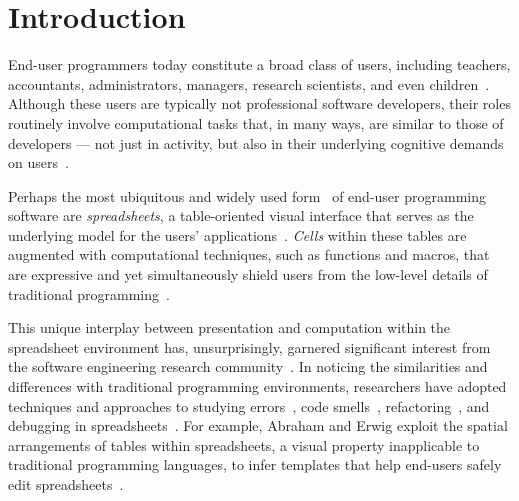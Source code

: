 \documentclass[conference]{IEEEtran}
\begin{document}

\section{Introduction}

End-user programmers today constitute a broad class of users, including teachers, accountants, administrators, managers, research scientists, and even children~\cite{Ko2011}.
%
Although these users are typically not professional software developers, their roles routinely involve computational tasks that, in many ways, are similar to those of developers --- not just in activity, but also in their underlying cognitive demands on users~\cite{Blackwell2002}. 


Perhaps the most ubiquitous and widely used form~\cite{Scaffidi2005} of end-user programming software are \emph{spreadsheets}, a table-oriented visual interface that serves as the underlying model for the users' applications~\cite{Nardi1990}. \emph{Cells} within these tables are augmented with computational techniques, such as functions and macros, that are expressive and yet simultaneously shield users from the low-level details of traditional programming~\cite{Nardi1990}.


This unique interplay between presentation and computation within the spreadsheet environment has, unsurprisingly, garnered significant interest from the software engineering research community~\cite{Burnett2009}. In noticing the similarities and differences with traditional programming environments, researchers have adopted techniques and approaches to studying errors~\cite{Pinzger2012}, code smells~\cite{Badame2012}, refactoring~\cite{Abraham2007}, and debugging in spreadsheets~\cite{Powell2008}. For example, Abraham and Erwig exploit the spatial arrangements of tables within spreadsheets, a visual property inapplicable to traditional programming languages, to infer templates that help end-users safely edit spreadsheets~\cite{Abraham2006}.
\end{document}
